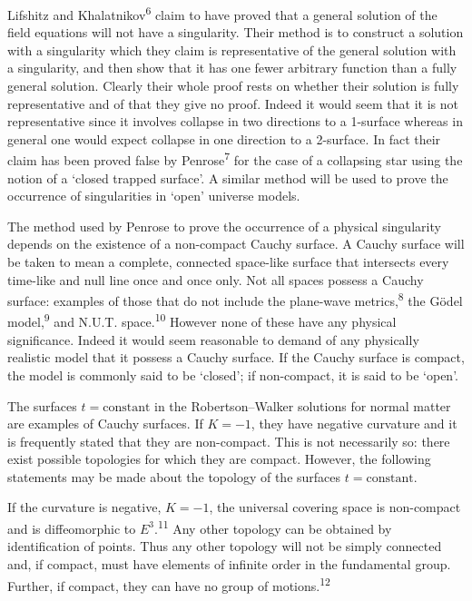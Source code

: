 
Lifshitz and Khalatnikov\textsuperscript{6} claim to have proved that a
general solution of the field equations will not have a singularity. Their
method is to construct a solution with a singularity which they claim is
representative of the general solution with a singularity, and then show that
it has one fewer arbitrary function than a fully general solution. Clearly
their whole proof rests on whether their solution is fully representative and
of that they give no proof. Indeed it would seem that it is not representative
since it involves collapse in two directions to a 1-surface whereas in general
one would expect collapse in one direction to a 2-surface. In fact their claim
has been proved false by Penrose\textsuperscript{7} for the case of a
collapsing star using the notion of a `closed trapped surface'. A similar
method will be used to prove the occurrence of singularities in `open'
universe models.


The method used by Penrose to prove the occurrence of a physical singularity
depends on the existence of a non-compact Cauchy surface. A Cauchy surface will
be taken to mean a complete, connected space-like surface that intersects
every time-like and null line once and once only. Not all spaces possess a
Cauchy surface: examples of those that do not include the plane-wave
metrics,\textsuperscript{8} the G\"odel model,\textsuperscript{9} and N.U.T.
space.\textsuperscript{10} However none of these have any physical
significance. Indeed it would seem reasonable to demand of any physically
realistic model that it possess a Cauchy surface. If the Cauchy surface is
compact, the model is commonly said to be `closed'; if non-compact, it is said
to be `open'.

The surfaces $t=\text{constant}$ in the Robertson--Walker solutions for
normal matter are examples of Cauchy surfaces. If $K=-1$, they have negative
curvature and it is frequently stated that they are non-compact. This is not
necessarily so: there exist possible topologies for which they are compact.
However, the following statements may be made about the topology of the
surfaces $t=\text{constant}$.

If the curvature is negative, $K=-1$, the universal covering space is
non-compact and is diffeomorphic to $E^3$.\textsuperscript{11} Any other
topology can be obtained by identification of points. Thus any other topology
will not be simply connected and, if compact, must have elements of infinite
order in the fundamental group. Further, if compact, they can have no group
of motions.\textsuperscript{12}

